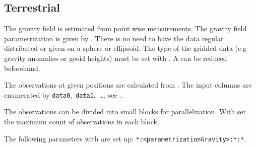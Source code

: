 \subsection{Terrestrial}\label{observationType:terrestrial}
The gravity field is estimated from point wise measurements.
The gravity field parametrization is given by .
There is no need to have the data regular distributed or given on a sphere or ellipsoid.
The type of the gridded data (e.g gravity anomalies or geoid heights)
must be set with .
A  can be reduced beforehand.

The observations at given positions are calculated from
.
The input columns are enumerated by \verb|data0|,~\verb|data1|,~\ldots,
see~.

The observations can be divided into small blocks for parallelization.
With  set the maximum count of observations in each block.

The following parameters with  are set up:
\verb|*:<parametrizationGravity>:*:*|.


